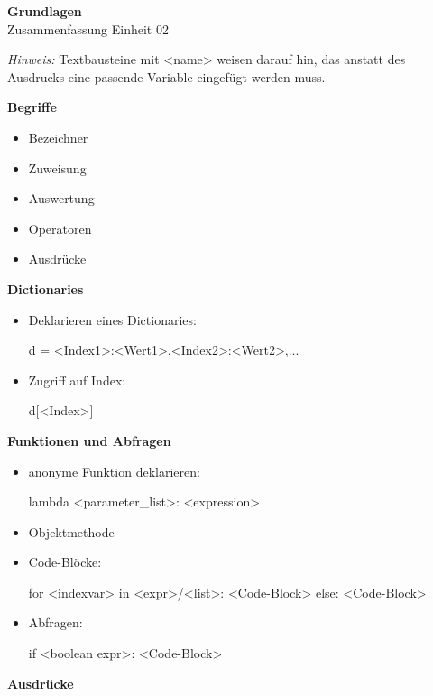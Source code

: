\documentclass[a4paper,9pt,DIV15,twocolumn]{scrartcl}
\begin{document}
\begin{center}
    \textbf{\LARGE Grundlagen}\\
    {\large Zusammenfassung Einheit 02}
\end{center}
\textsl{Hinweis:} Textbausteine mit <name> weisen darauf hin, das anstatt des Ausdrucks eine passende Variable eingefügt werden muss.

\medskip
\textbf{Begriffe}

\begin{itemize}
 \item Bezeichner
 \item Zuweisung
 \item Auswertung
 \item Operatoren
 \item Ausdrücke
\end{itemize}

\textbf{Dictionaries}

\begin{itemize}
 \item Deklarieren eines Dictionaries:
\begin{sagein}
d = {<Index1>:<Wert1>,<Index2>:<Wert2>,...}
\end{sagein}
 \item Zugriff auf Index:
\begin{sagein}
d[<Index>]
\end{sagein}
\end{itemize}

\textbf{Funktionen und Abfragen}

\begin{itemize}
 \item anonyme Funktion deklarieren:
\begin{sagein}
lambda <parameter_list>: <expression> 
\end{sagein}
 \item Objektmethode
 \item Code-Blöcke:
\begin{sagein}
for <indexvar> in <expr>/<list>:
    <Code-Block>
else:
    <Code-Block>
\end{sagein}
 \item Abfragen:
\begin{sagein}
if <boolean expr>:
    <Code-Block>
\end{sagein}

\end{itemize}

\textbf{Ausdrücke}
\end{document}
